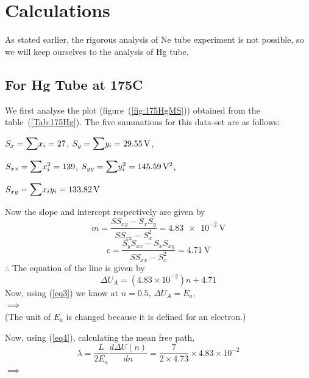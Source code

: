 \documentclass[%
 reprint,
 amsmath,amssymb,
 aps,
]{revtex4-2}
\begin{document}
\section{Calculations}
    As stated earlier, the rigorous analysis of Ne tube experiment is not possible, so we will keep ourselves to the analysis of Hg tube.
    \subsection{For Hg Tube at 175\degree C}
        We first analyse the plot (figure~(\ref{fig:175HgMS})) obtained from the table~(\ref{Tab:175Hg}). The five summations for this data-set are as follows:
        \par
        \vspace{0.5cm}
        $S_{x} = \mathlarger{\mathlarger{\sum}} x_{i} = 27$, \hspace{0.5cm} $S_{y} = \mathlarger{\mathlarger{\sum}} y_{i} = \SI{29.55}{\volt}$,
        \par
        \vspace{0.5cm}
        $S_{xx} = \mathlarger{\mathlarger{\sum}} x_{i}^2 = 139$, \hspace{0.5cm} $S_{yy} = \mathlarger{\mathlarger{\sum}} y_{i}^2 = \SI{145.59}{\volt\squared}$,
        \par
        \vspace{0.5cm}
        $S_{xy} = \mathlarger{\mathlarger{\sum}} x_{i}y_{i} = \SI{133.82}{\volt}$
        \par
        \vspace{0.5cm}
        Now the slope and intercept respectively are given by
        \begin{equation}
        \label{eq5}
            m = \dfrac{S S_{xy} - S_{x}S_{y}}{S S_{xx} - S_{x}^2} = \SI{4.83e-2}{\volt}
        \end{equation}
        \begin{equation}
        \label{eq6}
            c = \dfrac{S_{y} S_{xx} - S_{x}S_{xy}}{S S_{xx} - S_{x}^2} = \SI{4.71}{\volt}
        \end{equation}
        $\therefore$ The equation of the line is given by 
        \begin{equation}
        \label{eq7}
            \Delta U_A = (4.83 \times 10^{-2})n + 4.71
        \end{equation}
        Now, using (\ref{eq3}) we know at $n = 0.5$, $\Delta U_A = E_a$,\\
        $\implies$  \\
        (The unit of $E_a$ is changed because it is defined for an electron.)
        \par
        Now, using (\ref{eq4}), calculating the mean free path,
        \begin{equation}
        \label{eq8}
            \lambda = \frac{L}{2 E_a} \frac{d \Delta U(n)}{dn} = \dfrac{7}{2 \times 4.73} \times 4.83 \times 10^{-2}
        \end{equation}
        $\implies$ 
\end{document}
